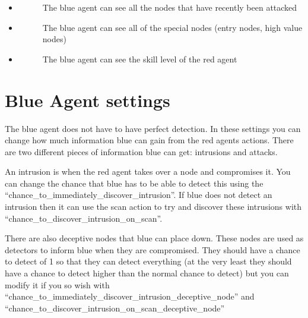 \documentclass[letterpaper,10pt,english]{sphinxmanual}
\begin{document}
\begin{itemize}
\begin{description}
\end{description}

\item {} \begin{description}
\item[{}] \leavevmode
\sphinxAtStartPar
The blue agent can see all the nodes that have recently been attacked

\end{description}

\item {} \begin{description}
\item[{}] \leavevmode
\sphinxAtStartPar
The blue agent can see all of the special nodes (entry nodes, high value nodes)

\end{description}

\item {} \begin{description}
\item[{}] \leavevmode
\sphinxAtStartPar
The blue agent can see the skill level of the red agent

\end{description}

\end{itemize}


\section{Blue Agent settings}
\label{\detokenize{source/config_file:blue-agent-settings}}
\sphinxAtStartPar
The blue agent does not have to have perfect detection. In these settings you can change how much information blue
can gain from the red agents actions. There are two different pieces of information blue can get: intrusions and
attacks.

\sphinxAtStartPar
{}

\sphinxAtStartPar
An intrusion is when the red agent takes over a node and compromises it. You can change the chance that blue has to
be able to detect this using the “chance\_to\_immediately\_discover\_intrusion”. If blue does not detect an intrusion
then it can use the scan action to try and discover these intrusions with “chance\_to\_discover\_intrusion\_on\_scan”.

\sphinxAtStartPar
There are also deceptive nodes that blue can place down. These nodes are used as detectors to inform blue when they
are compromised. They should have a chance to detect of 1 so that they can detect everything (at the very least
they should have a chance to detect higher than the normal chance to detect) but you can modify it if you so wish
with “chance\_to\_immediately\_discover\_intrusion\_deceptive\_node” and “chance\_to\_discover\_intrusion\_on\_scan\_deceptive\_node”
\end{document}
